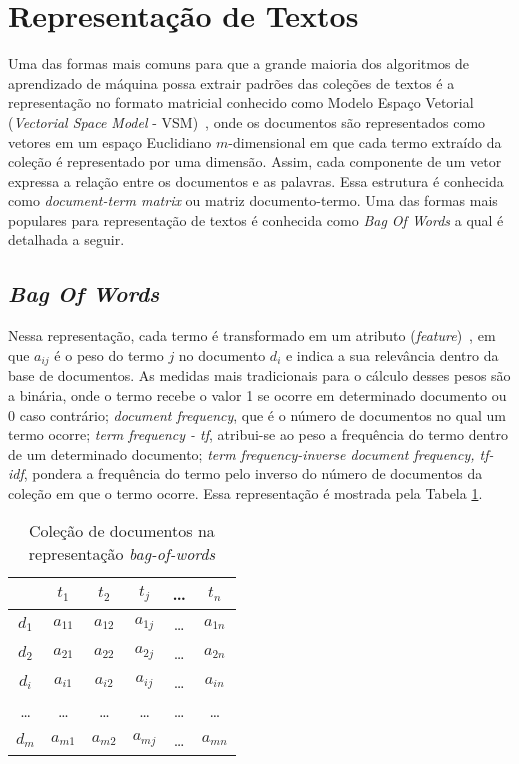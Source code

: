 \section{Representação de Textos} \label{section:RepTextos}


Uma das formas mais comuns para que a grande maioria dos algoritmos de aprendizado de máquina possa extrair padrões das coleções de textos é a representação no formato matricial conhecido como Modelo Espaço Vetorial (\textit{Vectorial Space Model} - VSM)~\cite{Rezende2003}, onde os documentos são representados como vetores em um espaço Euclidiano $m$-dimensional em que cada termo extraído da coleção é representado por uma dimensão. Assim, cada componente de um vetor expressa a relação entre os documentos e as palavras. Essa estrutura é conhecida como \textit{document-term matrix} ou matriz documento-termo. Uma das formas mais populares para representação de textos é conhecida como \textit{Bag Of Words} a qual é detalhada a seguir.
	

\subsection{\textit{Bag Of Words}} \label{subsubsec:BOW}
		
Nessa representação, cada termo é transformado em um atributo  (\textit{feature})~\cite{Rezende2003}, em que $a_{ij}$ é o peso do termo $j$ no documento $d_i$ e indica a sua relevância dentro da base de documentos. As medidas mais tradicionais para o cálculo desses pesos são a binária, onde o termo recebe o valor 1 se ocorre em determinado documento ou 0 caso contrário; \textit{document frequency}, que é o número de documentos no qual um termo ocorre; \textit{term frequency - tf}, atribui-se ao peso a frequência do termo dentro de um determinado documento; \textit{term frequency-inverse document frequency, tf-idf}, pondera a frequência do termo pelo inverso do número de documentos da coleção em que o termo ocorre.
Essa representação é mostrada pela Tabela \ref{table:bagofwords}.

\begin{table}[!h]
	\centering

	\begin{tabular}{|c|c|c|c|c|c|}

	\hline
	    & $t_1$      & $t_2$     & $t_j$    & \dots & $t_n$      \\ \hline
	$d_1$ & $a_{11}$ & $a_{12}$  & $a_{1j}$ & \dots & $a_{1n}$   \\ \hline 
	$d_2$ & $a_{21}$ & $a_{22}$  & $a_{2j}$ & \dots & $a_{2n}$   \\ \hline 
	$d_i$ & $a_{i1}$ & $a_{i2}$  & $a_{ij}$ & \dots & $a_{in}$   \\ \hline 
	\dots & \dots    & \dots     & \dots    & \dots & \dots      \\ \hline 
	$d_m$ & $a_{m1}$ & $a_{m2}$  & $a_{mj}$ & \dots & $a_{mn}$   \\ \hline 

	\end{tabular}

	\caption{Coleção de documentos na representação \textit{bag-of-words}}
	\label{table:bagofwords} 
\end{table}


